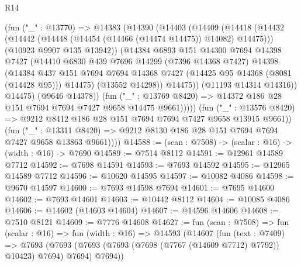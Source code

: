\begin{lexlean}{R14}
\begin{coremodule}
                    (fun ("_" : @13770) =>
                    @14383
                      (@14390
                        (@14403
                          (@14409
                            (@14418
                              (@14432
                                (@14442 (@14448 (@14454 (@14466 (@14474 @14475)) @14082) @14475)))
                              (@10923 @9907 @135 @13942))
                            (@14384
                              @6893
                              @151
                              @14300
                              @7694
                              @14398
                              @7427
                              (@14410
                                @6830
                                @439
                                @7696
                                @14299
                                (@7396 @14368 @7427)
                                @14398
                                (@14384
                                  @437
                                  @151
                                  @7694
                                  @7694
                                  @14368
                                  @7427
                                  (@14425 @95 @14368 (@8081 (@14428 @95)))
                                  @14475)
                                (@13552 @14298))
                              @14475))
                          (@11193 @14314 @14316))
                        @14475)
                      (@9646 @14378))
                    (fun ("_" : @13769 @8420) =>
                    @14372 @186 @28 @151 @7694 @7694 @7427 @9658 @14475 @9661)))))
            (fun ("_" : @13576 @8420) =>
            @9212 @8412 @186 @28 @151 @7694 @7694 @7427 @9658 @13915 @9661))
          (fun ("_" : @13311 @8420) =>
          @9212 @8130 @186 @28 @151 @7694 @7694 @7427 @9658 @13863 @9661))))
@14588 := (scan : @7508) -> (scalar : @16) -> (width : @16) -> @7690
@14589 := @7514 @8112
@14591 := @12961 @14589 @7712
@14592 := @7698 @14591
@14593 := @7693 @14592
@14595 := @12965 @14589 @7712
@14596 := @10620 @14595
@14597 := @10082 @4086
@14598 := @9670 @14597
@14600 := @7693 @14598 @7694
@14601 := @7695 @14600
@14602 := @7693 @14601
@14603 := @10442 @8112
@14604 := @10085 @4086
@14606 := @14602 (@14603 @14604)
@14607 := @14596 @14606
@14608 := @7510 @8121
@14609 := @7776 @14608
@14627 := fun (scan : @7508) =>
  fun (scalar : @16) =>
  fun (width : @16) =>
  @14593
    (@14607
      (fun (text : @7409) =>
      @7693 (@7693 (@7693 (@7693 (@7698 (@7767 (@14609 @7712) @7792)) @10423) @7694) @7694) @7694))

\end{coremodule}
\end{lexlean}

